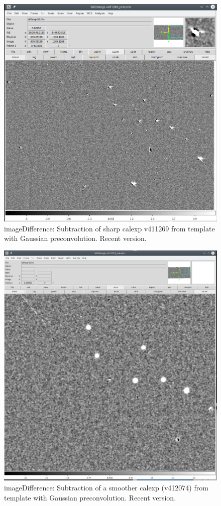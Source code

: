 \documentclass{article}
\begin{document}
%
\begin{figure}
  \includegraphics[width=\textwidth]{Scr_v411269_preconv.png}
\caption{imageDifference: Subtraction of sharp calexp v411269 from template with Gaussian
  preconvolution. Recent version.}
\end{figure}
%
\begin{figure}
  \includegraphics[width=\textwidth]{Scr_v412074_preconv.png}
\caption{imageDifference: Subtraction of a smoother calexp (v412074) from template with Gaussian
  preconvolution. Recent version.}
\end{figure}
\end{document}
